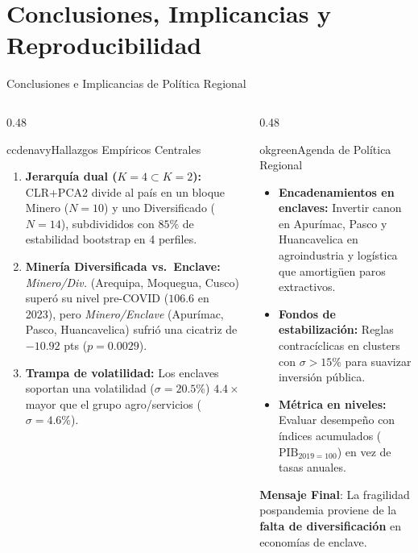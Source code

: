 \section{Conclusiones, Implicancias y Reproducibilidad}

\begin{frame}{Conclusiones e Implicancias de Política Regional}
\vspace{-0.18cm}
\begin{columns}[T,onlytextwidth]
\begin{column}{0.48\textwidth}
\begin{contrastbox}{ccdenavy}{Hallazgos Empíricos Centrales}
\scriptsize\RaggedRight
\begin{enumerate}\setlength{\itemsep}{0.06em}
  \item \textbf{Jerarquía dual ($K=4 \subset K=2$):} CLR+PCA2 divide al país en un bloque Minero ($N=10$) y uno Diversificado ($N=14$), subdivididos con $85\%$ de estabilidad bootstrap en 4 perfiles.
  \item \textbf{Minería Diversificada vs.\ Enclave:} \textit{Minero/Div.} (Arequipa, Moquegua, Cusco) superó su nivel pre-COVID ($106.6$ en 2023), pero \textit{Minero/Enclave} (Apurímac, Pasco, Huancavelica) sufrió una cicatriz de $-10.92$ pts ($p=0.0029$).
  \item \textbf{Trampa de volatilidad:} Los enclaves soportan una volatilidad ($\sigma=20.5\%$) $4.4\times$ mayor que el grupo agro/servicios ($\sigma=4.6\%$).
\end{enumerate}
\end{contrastbox}
\end{column}

\begin{column}{0.48\textwidth}
\begin{contrastbox}{okgreen}{Agenda de Política Regional}
\scriptsize\RaggedRight
\begin{itemize}\setlength{\itemsep}{0.04em}
  \item \textbf{Encadenamientos en enclaves:} Invertir canon en Apurímac, Pasco y Huancavelica en agroindustria y logística que amortigüen paros extractivos.
  \item \textbf{Fondos de estabilización:} Reglas contracíclicas en clusters con $\sigma > 15\%$ para suavizar inversión pública.
  \item \textbf{Métrica en niveles:} Evaluar desempeño con índices acumulados ($\text{PIB}_{2019=100}$) en vez de tasas anuales.
\end{itemize}
\end{contrastbox}
\vspace{0.03cm}
\begin{keybox}[left=2mm,right=2mm,top=0.6mm,bottom=0.6mm]
\scriptsize\RaggedRight \textbf{Mensaje Final}: La fragilidad pospandemia proviene de la \textbf{falta de diversificación} en economías de enclave.
\end{keybox}
\end{column}
\end{columns}
\end{frame}

